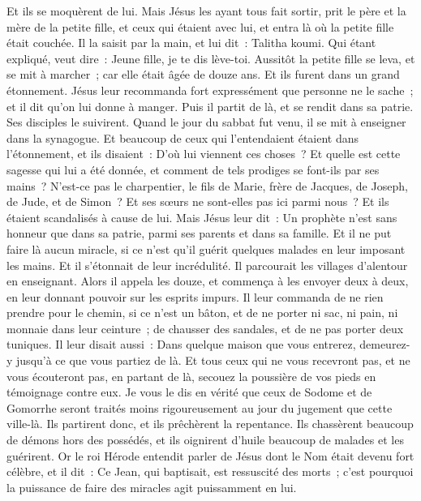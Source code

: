 \begin{multicols}{2}
Et ils se moquèrent de lui. Mais Jésus les ayant tous fait sortir, prit le père et la mère de la petite fille, et ceux qui étaient avec lui, et entra là où la petite fille était couchée.
Il la saisit par la main, et lui dit~: Talitha koumi. Qui étant expliqué, veut dire~: Jeune fille, je te dis lève-toi.
Aussitôt la petite fille se leva, et se mit à marcher~; car elle était âgée de douze ans. Et ils furent dans un grand étonnement.
Jésus leur recommanda fort expressément que personne ne le sache~; et il dit qu'on lui donne à manger.
\VerseOne{}Puis il partit de là, et se rendit dans sa patrie. Ses disciples le suivirent.
Quand le jour du sabbat fut venu, il se mit à enseigner dans la synagogue. Et beaucoup de ceux qui l'entendaient étaient dans l'étonnement, et ils disaient~: D'où lui viennent ces choses~? Et quelle est cette sagesse qui lui a été donnée, et comment de tels prodiges se font-ils par ses mains~?
N'est-ce pas le charpentier, le fils de Marie, frère de Jacques, de Joseph, de Jude, et de Simon~? Et ses sœurs ne sont-elles pas ici parmi nous~? Et ils étaient scandalisés à cause de lui.
Mais Jésus leur dit~: Un prophète n'est sans honneur que dans sa patrie, parmi ses parents et dans sa famille.
Et il ne put faire là aucun miracle, si ce n'est qu'il guérit quelques malades en leur imposant les mains.
Et il s'étonnait de leur incrédulité. Il parcourait les villages d'alentour en enseignant.
Alors il appela les douze, et commença à les envoyer deux à deux, en leur donnant pouvoir sur les esprits impurs.
Il leur commanda de ne rien prendre pour le chemin, si ce n'est un bâton, et de ne porter ni sac, ni pain, ni monnaie dans leur ceinture~;
de chausser des sandales, et de ne pas porter deux tuniques.
Il leur disait aussi~: Dans quelque maison que vous entrerez, demeurez-y jusqu'à ce que vous partiez de là.
Et tous ceux qui ne vous recevront pas, et ne vous écouteront pas, en partant de là, secouez la poussière de vos pieds en témoignage contre eux. Je vous le dis en vérité que ceux de Sodome et de Gomorrhe seront traités moins rigoureusement au jour du jugement que cette ville-là.
Ils partirent donc, et ils prêchèrent la repentance.
Ils chassèrent beaucoup de démons hors des possédés, et ils oignirent d'huile beaucoup de malades et les guérirent.
Or le roi Hérode entendit parler de Jésus dont le Nom était devenu fort célèbre, et il dit~: Ce Jean, qui baptisait, est ressuscité des morts~; c'est pourquoi la puissance de faire des miracles agit puissamment en lui.

\end{multicols}
